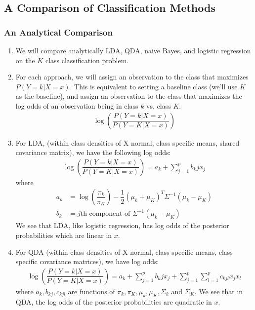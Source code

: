 \documentclass[10pt]{article}
\begin{document}
\vspace{.2in} 

\subsection{A Comparison of Classification Methods} 
\subsubsection{An Analytical Comparison} 
\begin{enumerate}
	\item We will compare analytically LDA, QDA, naive Bayes, and logistic regression on the $K$ class classification problem.  
	\item For each approach, we will assign an observation to the class that maximizes $P(Y = k| X = x)$. This is equivalent to setting a baseline class (we'll use $K$ as the baseline), and assign an observation to the class that maximizes the log odds of an observation being in class $k$ vs. class $K$.
	\begin{align*}
		\log\left(\dfrac{P(Y = k | X = x)}{P(Y = K| X = x)} \right) 
	\end{align*}
	\item For LDA, (within class densities of X normal, class specific means, shared covariance matrix), we have the following log odds:
	\begin{align*}
		\log\left(\dfrac{P(Y = k | X = x)}{P(Y = K| X = x)} \right)  = a_k + \sum_{j = 1}^p b_kj x_j 
	\end{align*}
	where 
	\begin{align*}
		a_k &= \log\left(\dfrac{\pi_k}{\pi_K} \right) - \dfrac{1}{2}(\mu_k + \mu_K)^T\Sigma^{-1}(\mu_k - \mu_K) \\
		b_k &= \text{$j$th component of } \Sigma^{-1}(\mu_k - \mu_K) 
	\end{align*}
	We see that LDA, like logistic regression, has log odds of the posterior probabilities which are linear in $x$. 
	\item For QDA (within class densities of X normal, class specific means, class specific covariance matrices), we have log odds:
	\begin{align*}
		\log\left(\dfrac{P(Y = k | X = x)}{P(Y = K| X = x)} \right)  = a_k + \sum_{j = 1}^p b_kj x_j  + \sum_{j = 1}^p \sum_{l = 1}^p c_{kjl}x_j x_l 
	\end{align*}
	where $a_k, b_{kj}, c_{kjl}$ are functions of $\pi_k, \pi_K, \mu_k, \mu_K, \Sigma_k$ and $\Sigma_K$. We see that in QDA, the log odds of the posterior probabilities are quadratic in $x$.

\end{enumerate}
\end{document}
